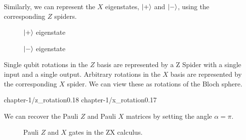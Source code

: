 Similarly, we can represent the $X$ eigenstates, $\ket +$ and $\ket -$, using the corresponding $Z$ spiders.

\begin{figure}[H]
\centering
\begin{minipage}{.4\textwidth}
    \centering
    \caption{$\ket +$ eigenstate}
\end{minipage}%
\begin{minipage}{.4\textwidth}
    \centering
    \caption{$\ket -$ eigenstate}
\end{minipage}
\end{figure}

Single qubit rotations in the $Z$ basis are represented by a Z Spider with a single input and a single output. Arbitrary rotations in the $X$ basis are represented by the corresponding $X$ spider. We can view these as rotations of the Bloch sphere.

{chapter-1/z_rotation}{0.18}
\vspace*{-15pt}
{chapter-1/x_rotation}{0.17}

We can recover the Pauli $Z$ and Pauli $X$ matrices by setting the angle $\alpha = \pi$.

\begin{figure}[H]
\centering
{}
\caption{Pauli $Z$ and $X$ gates in the ZX calculus.}
\end{figure}

